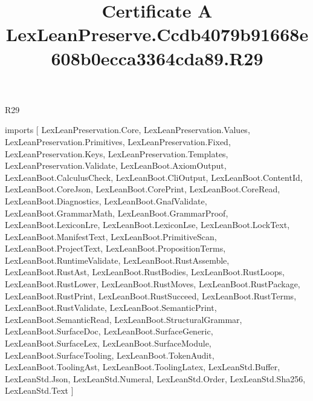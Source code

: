 \begin{lexlean}{R29}
\title{Certificate A LexLeanPreserve.Ccdb4079b91668e608b0ecca3364cda89.R29}
\begin{coremodule}
imports [
  LexLeanPreservation.Core,
  LexLeanPreservation.Values,
  LexLeanPreservation.Primitives,
  LexLeanPreservation.Fixed,
  LexLeanPreservation.Keys,
  LexLeanPreservation.Templates,
  LexLeanPreservation.Validate,
  LexLeanBoot.AxiomOutput,
  LexLeanBoot.CalculusCheck,
  LexLeanBoot.CliOutput,
  LexLeanBoot.ContentId,
  LexLeanBoot.CoreJson,
  LexLeanBoot.CorePrint,
  LexLeanBoot.CoreRead,
  LexLeanBoot.Diagnostics,
  LexLeanBoot.GnafValidate,
  LexLeanBoot.GrammarMath,
  LexLeanBoot.GrammarProof,
  LexLeanBoot.LexiconLre,
  LexLeanBoot.LexiconLse,
  LexLeanBoot.LockText,
  LexLeanBoot.ManifestText,
  LexLeanBoot.PrimitiveScan,
  LexLeanBoot.ProjectText,
  LexLeanBoot.PropositionTerms,
  LexLeanBoot.RuntimeValidate,
  LexLeanBoot.RustAssemble,
  LexLeanBoot.RustAst,
  LexLeanBoot.RustBodies,
  LexLeanBoot.RustLoops,
  LexLeanBoot.RustLower,
  LexLeanBoot.RustMoves,
  LexLeanBoot.RustPackage,
  LexLeanBoot.RustPrint,
  LexLeanBoot.RustSucceed,
  LexLeanBoot.RustTerms,
  LexLeanBoot.RustValidate,
  LexLeanBoot.SemanticPrint,
  LexLeanBoot.SemanticRead,
  LexLeanBoot.StructuralGrammar,
  LexLeanBoot.SurfaceDoc,
  LexLeanBoot.SurfaceGeneric,
  LexLeanBoot.SurfaceLex,
  LexLeanBoot.SurfaceModule,
  LexLeanBoot.SurfaceTooling,
  LexLeanBoot.TokenAudit,
  LexLeanBoot.ToolingAst,
  LexLeanBoot.ToolingLatex,
  LexLeanStd.Buffer,
  LexLeanStd.Json,
  LexLeanStd.Numeral,
  LexLeanStd.Order,
  LexLeanStd.Sha256,
  LexLeanStd.Text
]


\end{coremodule}
\end{lexlean}
